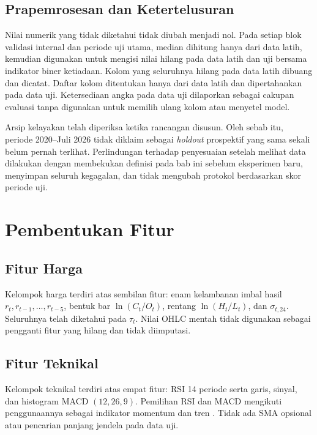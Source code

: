 \subsection{Prapemrosesan dan Ketertelusuran}

Nilai numerik yang tidak diketahui tidak diubah menjadi nol. Pada setiap blok validasi internal dan periode uji utama, median dihitung hanya dari data latih, kemudian digunakan untuk mengisi nilai hilang pada data latih dan uji bersama indikator biner ketiadaan. Kolom yang seluruhnya hilang pada data latih dibuang dan dicatat. Daftar kolom ditentukan hanya dari data latih dan dipertahankan pada data uji. Ketersediaan angka pada data uji dilaporkan sebagai cakupan evaluasi tanpa digunakan untuk memilih ulang kolom atau menyetel model.

Arsip kelayakan telah diperiksa ketika rancangan disusun. Oleh sebab itu, periode 2020--Juli 2026 tidak diklaim sebagai \emph{holdout} prospektif yang sama sekali belum pernah terlihat. Perlindungan terhadap penyesuaian setelah melihat data dilakukan dengan membekukan definisi pada bab ini sebelum eksperimen baru, menyimpan seluruh kegagalan, dan tidak mengubah protokol berdasarkan skor periode uji.

\section{Pembentukan Fitur}

\subsection{Fitur Harga}

Kelompok harga terdiri atas sembilan fitur: enam kelambanan imbal hasil $r_t,r_{t-1},\ldots,r_{t-5}$, bentuk bar $\ln(C_t/O_t)$, rentang $\ln(H_t/L_t)$, dan $\sigma_{t,24}$. Seluruhnya telah diketahui pada $\tau_t$. Nilai OHLC mentah tidak digunakan sebagai pengganti fitur yang hilang dan tidak diimputasi.

\subsection{Fitur Teknikal}

Kelompok teknikal terdiri atas empat fitur: RSI 14 periode serta garis, sinyal, dan histogram MACD $(12,26,9)$. Pemilihan RSI dan MACD mengikuti penggunaannya sebagai indikator momentum dan tren \parencite{wilder1978new,murphy1999technical}. Tidak ada SMA opsional atau pencarian panjang jendela pada data uji.

